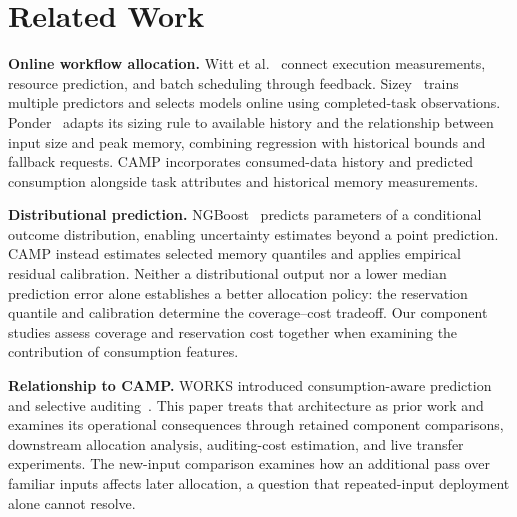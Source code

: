 \section{Related Work}
\label{sec:related}
\textbf{Online workflow allocation.}
Witt et al.~\cite{witt2019feedback} connect execution measurements,
resource prediction, and batch scheduling through feedback.
Sizey~\cite{bader2024sizey} trains multiple predictors and selects models
online using completed-task observations. Ponder~\cite{lehmann2024ponder}
adapts its sizing rule to available history and the relationship between
input size and peak memory, combining regression with historical bounds
and fallback requests. CAMP incorporates consumed-data history and predicted
consumption alongside task attributes and historical memory measurements.

\textbf{Distributional prediction.}
NGBoost~\cite{duan2020ngboost} predicts parameters of a conditional outcome
distribution, enabling uncertainty estimates beyond a point prediction.
CAMP instead estimates selected memory quantiles and applies empirical
residual calibration. Neither a distributional output nor a lower median
prediction error alone establishes a better allocation policy: the
reservation quantile and calibration determine the coverage--cost
tradeoff. Our component studies assess coverage and reservation cost together
when examining the contribution of consumption features.

\textbf{Relationship to CAMP.}
WORKS introduced consumption-aware prediction and selective
auditing~\cite{camp2026works}. This paper treats that architecture as
prior work and examines its operational consequences through retained
component comparisons, downstream allocation analysis, auditing-cost
estimation, and
live transfer experiments. The new-input comparison examines how an
additional pass over familiar inputs affects later allocation, a question
that repeated-input deployment alone cannot resolve.
